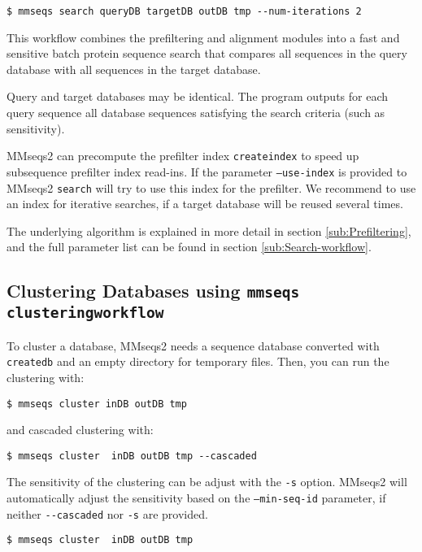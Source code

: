 \documentclass[11pt,a4paper]{scrreprt}
\begin{document}
\begin{verbatim}
$ mmseqs search queryDB targetDB outDB tmp --num-iterations 2
\end{verbatim}




This workflow combines the prefiltering and alignment modules into a fast and sensitive batch protein sequence search that compares all sequences in the query database with all sequences in the target database.


Query and target databases may be identical. The program outputs for each query sequence all database sequences satisfying the search criteria (such as sensitivity).


MMseqs2 can precompute the prefilter index \texttt{createindex} to speed up subsequence prefilter index read-ins. If the parameter \texttt{--use-index} is provided to MMseqs2 \texttt{search} will try to use this index for the prefilter. We recommend to use an index for iterative searches, if a target database will be reused several times.


The underlying algorithm is explained in more detail in section \ref{sub:Prefiltering}, and the full parameter list can be found in section \ref{sub:Search-workflow}.
\subsection{Clustering Databases using \texttt{mmseqs clusteringworkflow}} \label{sub:Clustering}
To cluster a database, MMseqs2 needs a sequence database converted with \texttt{createdb} and an empty directory for temporary files. Then, you can run the clustering with:


\begin{verbatim}
$ mmseqs cluster inDB outDB tmp
\end{verbatim}


and cascaded clustering with:


\begin{verbatim}
$ mmseqs cluster  inDB outDB tmp --cascaded
\end{verbatim}


The sensitivity of the clustering can be adjust with the \texttt{-s} option. MMseqs2 will automatically adjust the sensitivity based on the \texttt{--min-seq-id} parameter, if neither \texttt{-{}-cascaded} nor \texttt{-s} are  provided. 


\begin{verbatim}
$ mmseqs cluster  inDB outDB tmp 
\end{verbatim}
\end{document}
